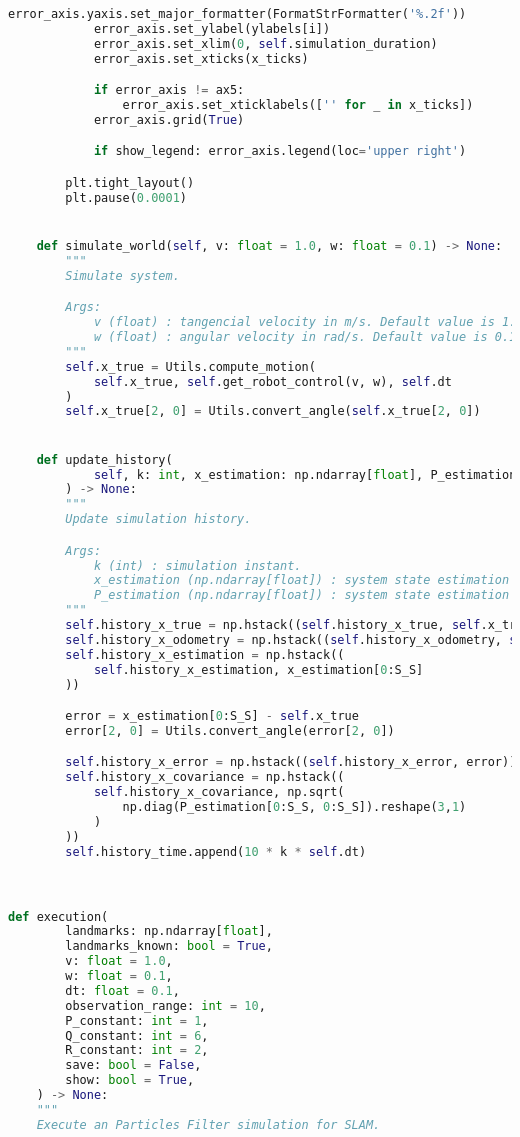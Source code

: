 \documentclass[../CSC_5RO12_TA_TP4.tex]{subfiles}
\begin{document}
\begin{scriptsize}
\begin{lstlisting}[language=Python]
            error_axis.yaxis.set_major_formatter(FormatStrFormatter('%.2f'))
            error_axis.set_ylabel(ylabels[i])
            error_axis.set_xlim(0, self.simulation_duration)
            error_axis.set_xticks(x_ticks)

            if error_axis != ax5:
                error_axis.set_xticklabels(['' for _ in x_ticks])
            error_axis.grid(True)

            if show_legend: error_axis.legend(loc='upper right')

        plt.tight_layout()
        plt.pause(0.0001)


    def simulate_world(self, v: float = 1.0, w: float = 0.1) -> None:
        """
        Simulate system.

        Args:
            v (float) : tangencial velocity in m/s. Default value is 1.0 m/s.
            w (float) : angular velocity in rad/s. Default value is 0.1 rad/s.
        """
        self.x_true = Utils.compute_motion(
            self.x_true, self.get_robot_control(v, w), self.dt
        )
        self.x_true[2, 0] = Utils.convert_angle(self.x_true[2, 0])


    def update_history(
            self, k: int, x_estimation: np.ndarray[float], P_estimation: np.ndarray[float]
        ) -> None:
        """
        Update simulation history.

        Args:
            k (int) : simulation instant.
            x_estimation (np.ndarray[float]) : system state estimation at instant k.
            P_estimation (np.ndarray[float]) : system state estimation covariance at instant k.
        """
        self.history_x_true = np.hstack((self.history_x_true, self.x_true))
        self.history_x_odometry = np.hstack((self.history_x_odometry, self.x_odometry))
        self.history_x_estimation = np.hstack((
            self.history_x_estimation, x_estimation[0:S_S]
        ))

        error = x_estimation[0:S_S] - self.x_true
        error[2, 0] = Utils.convert_angle(error[2, 0])

        self.history_x_error = np.hstack((self.history_x_error, error))
        self.history_x_covariance = np.hstack((
            self.history_x_covariance, np.sqrt(
                np.diag(P_estimation[0:S_S, 0:S_S]).reshape(3,1)
            )
        ))
        self.history_time.append(10 * k * self.dt)



def execution(
        landmarks: np.ndarray[float],
        landmarks_known: bool = True,
        v: float = 1.0,
        w: float = 0.1,
        dt: float = 0.1,
        observation_range: int = 10,
        P_constant: int = 1,
        Q_constant: int = 6,
        R_constant: int = 2,
        save: bool = False,
        show: bool = True,
    ) -> None:
    """
    Execute an Particles Filter simulation for SLAM.


\end{lstlisting}
\end{scriptsize}
\end{document}
